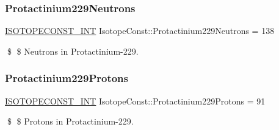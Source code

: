 \subsubsection{\texorpdfstring{Protactinium229\+Neutrons}{Protactinium229Neutrons}}
{\footnotesize\ttfamily \mbox{\hyperlink{group___isotope_const-_macros_ga5f18360b3e99483a35c32d789e62621c}{I\+S\+O\+T\+O\+P\+E\+C\+O\+N\+S\+T\+\_\+\+I\+NT}} Isotope\+Const\+::\+Protactinium229\+Neutrons = 138}

\$ \$ Neutrons in Protactinium-\/229. \mbox{\label{group___isotope_const-_protactinium-_pa229_gafcbb7d91257b5941d2965d4bda73336d}} 
\subsubsection{\texorpdfstring{Protactinium229\+Protons}{Protactinium229Protons}}
{\footnotesize\ttfamily \mbox{\hyperlink{group___isotope_const-_macros_ga5f18360b3e99483a35c32d789e62621c}{I\+S\+O\+T\+O\+P\+E\+C\+O\+N\+S\+T\+\_\+\+I\+NT}} Isotope\+Const\+::\+Protactinium229\+Protons = 91}

\$ \$ Protons in Protactinium-\/229. 